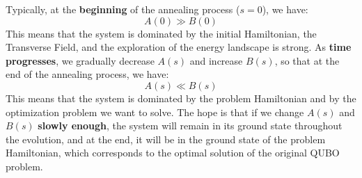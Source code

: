 \highspace
Typically, at the \textbf{beginning} of the annealing process ($s=0$), we have:
\begin{equation*}
    A(0) \gg B(0)
\end{equation*}
This means that the system is dominated by the initial Hamiltonian, the Transverse Field, and the exploration of the energy landscape is strong. As \textbf{time progresses}, we gradually decrease $A(s)$ and increase $B(s)$, so that at the end of the annealing process, we have:
\begin{equation*}
    A(s) \ll B(s)
\end{equation*}
This means that the system is dominated by the problem Hamiltonian and by the optimization problem we want to solve. The hope is that if we change $A(s)$ and $B(s)$ \textbf{slowly enough}, the system will remain in its ground state throughout the evolution, and at the end, it will be in the ground state of the problem Hamiltonian, which corresponds to the optimal solution of the original QUBO problem.

